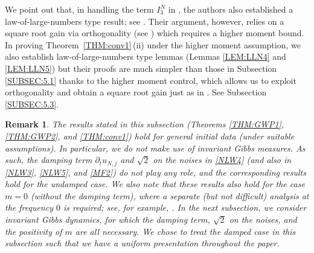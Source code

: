 \documentclass[letterpaper, 11pt,  reqno]{amsart}
\newtheorem{remark}[theorem]{Remark}
\newcommand{\1}{\hspace{0.5mm}\text{I}\hspace{0.2mm}}
\newcommand{\dt}{\partial_t}
\numberwithin{equation}{section}
\numberwithin{theorem}{section}
\begin{document}
We point out that, in handling the term $I_3^N$ in \cite[(4.5)]{SSZZ}, 
the authors also established a law-of-large-numbers type result;
see \cite[Step 4 on p.\,163]{SSZZ}. 
Their argument, however,  relies on a square root gain 
via orthogonality
(see \cite[(4.1)]{SSZZ}) 
which requires a higher moment bound. 
In proving 
Theorem~\ref{THM:conv1}\,(ii) 
under the higher moment assumption,  
we also 
establish 
 law-of-large-numbers type lemmas
(Lemmas \ref{LEM:LLN4} and \ref{LEM:LLN5})
but their proofs are much simpler
than those in Subsection \ref{SUBSEC:5.1}
thanks to the higher moment control, 
which allows us to 
exploit orthogonality
and obtain a square root gain
just as in \cite{SSZZ}.
See Subsection \ref{SUBSEC:5.3}.











\begin{remark} \rm
 The results stated in this subsection
(Theorems \ref{THM:GWP1},  \ref{THM:GWP2},
and \ref{THM:conv1})
hold for general initial data (under suitable assumptions).
In particular, we do not make use of invariant Gibbs measures.
As such, 
the damping term $\dt u_{N, j}$
and 
$\sqrt 2$ on the noises in \eqref{NLW4}
(and also in  \eqref{NLW3}, \eqref{NLW5}, and \eqref{MF2})
do not play any role, 
and the corresponding results
hold for the undamped case.
We also note that
 these results also hold for the case  $m = 0$ (without the damping term), where a separate (but not difficult) analysis at the frequency $0$ is required; see, for example, \cite{GKO}.
In the next subsection, 
we consider invariant Gibbs dynamics, 
for which the damping term, 
$\sqrt 2$ on the noises, 
and the positivity of $m$ are all necessary.
We chose to treat the damped case
in this subsection 
such that we have a uniform presentation throughout the paper.




\end{remark}
\end{document}
